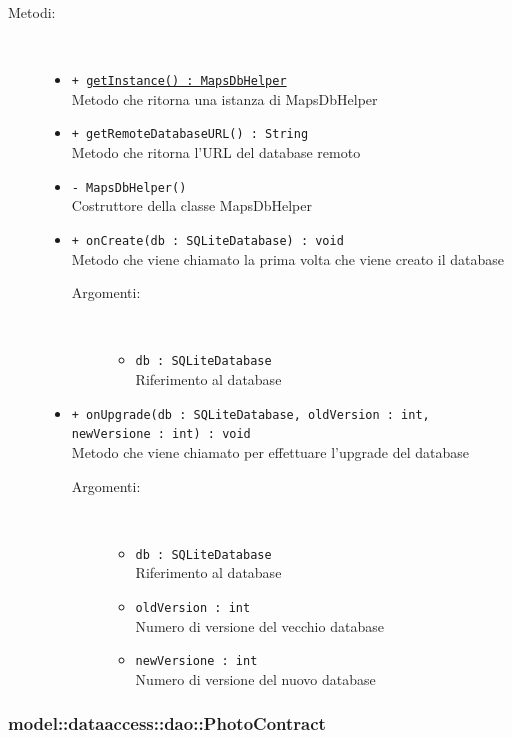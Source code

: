 \documentclass[../DefinizioneDiProdotto.tex]{subfiles}
\begin{document}
\begin{description}
\begin{itemize}
\end{itemize}
\item[Metodi:] \
\begin{itemize}
\item \texttt{+ \underline{getInstance() : MapsDbHelper}}\\
Metodo che ritorna una istanza di MapsDbHelper
 \item \texttt{+ getRemoteDatabaseURL() : String}\\
Metodo che ritorna l'URL del database remoto
 \item \texttt{- MapsDbHelper()}\\
Costruttore della classe MapsDbHelper
 \item \texttt{+ onCreate(db : SQLiteDatabase) : void}\\
Metodo che viene chiamato la prima volta che viene creato il database
 \begin{description}
\item[Argomenti:] \
\begin{itemize}
\item \texttt{db : SQLiteDatabase}\\
Riferimento al database\end{itemize}
\end{description}
\item \texttt{+ onUpgrade(db : SQLiteDatabase, oldVersion : int, newVersione : int) : void}\\
Metodo che viene chiamato per effettuare l'upgrade del database
 \begin{description}
\item[Argomenti:] \
\begin{itemize}
\item \texttt{db : SQLiteDatabase}\\
Riferimento al database\item \texttt{oldVersion : int}\\
Numero di versione del vecchio database\item \texttt{newVersione : int}\\
Numero di versione del nuovo database\end{itemize}
\end{description}
\end{itemize}
\end{description}

\subsubsection{model::dataaccess::dao::PhotoContract}
\end{document}

